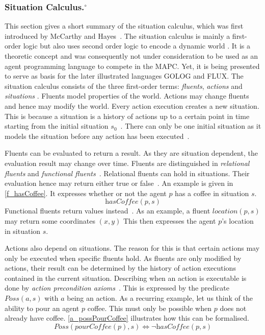\subsubsection[Situation Calculus.]{Situation Calculus.$^\circ$}\label{fun:apl_sitCalc}
This section gives a short summary of the situation calculus, which was first introduced by McCarthy and Hayes~\cite{mccarthy_philosophical_1969}.
The situation calculus is mainly a first-order logic but also uses second order logic to encode a dynamic world \cite{levesque_golog:_1997}. %
It is a theoretic concept and was consequently not under consideration to be used as an agent programming language to compete in the MAPC.
Yet, it is being presented to serve as basis for the later illustrated languages GOLOG and FLUX.
The situation calculus consists of the three first-order terms: \emph{fluents}, \emph{actions} and \emph{situations} \cite{mccarthy_philosophical_1969,boutilier_decision_2000}. %
Fluents model properties of the world.
Actions may change fluents and hence may modify the world.
Every action execution creates a new situation.
This is because a situation is a history of actions up to a certain point in time starting from the initial situation $s_0$~\cite{schiffel_reconciling_2006,levesque_golog:_1997}. %
There can only be one initial situation as it models the situation before any action has been executed~\cite{pirri_contributions_1999}. %

Fluents can be evaluated to return a result.
As they are situation dependent, the evaluation result may change over time.
Fluents are distinguished in \emph{relational fluents} and \emph{functional fluents}~\cite{levesque_golog:_1997}. %
Relational fluents can hold in situations.
Their evaluation hence may return either true or false~\cite{boutilier_decision_2000}. %
An example is given in \autoref{f_hasCoffee}.
It expresses whether or not the agent $p$ has a coffee in situation $s$.
\begin{equation}\label{f_hasCoffee}
  \textit{hasCoffee}(p,s)
\end{equation}
Functional fluents return values instead~\cite{levesque_golog:_1997}. %
As an example, a fluent $\textit{location}(p,s)$ may return some coordinates $(x,y)$ This then expresses the agent $p$'s location in situation $s$.

Actions also depend on situations.
The reason for this is that certain actions may only be executed when specific fluents hold.
As fluents are only modified by actions, their result can be determined by the history of action executions contained in the current situation.
Describing when an action is executable is done by \emph{action precondition axioms}~\cite{lin_state_1994}. %
This is expressed by the predicate $\textit{Poss}(a,s)$ with $a$ being an action.
As a recurring example, let us think of the ability to pour an agent $p$ coffee.
This must only be possible when $p$ does not already have coffee.
\autoref{a_possPourCoffee} illustrates how this can be formalised.
\begin{equation}\label{a_possPourCoffee}
  \textit{Poss}(\textit{pourCoffee}(p),s) \Leftrightarrow \neg \textit{hasCoffee}(p,s)
\end{equation}

